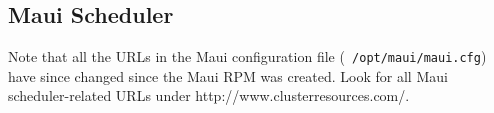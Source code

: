 %
%

\subsection{Maui Scheduler}

Note that all the URLs in the Maui configuration file ({\tt
  /opt/maui/maui.cfg}) have since changed since the Maui RPM was
created.  Look for all Maui scheduler-related URLs under
  http://www.clusterresources.com/. 


